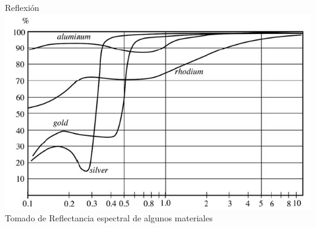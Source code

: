 \documentclass[aspectratio=169]{beamer}
\begin{document}
\begin{frame}{Reflexión}
            \centering
            \includegraphics[width = 0.7\linewidth]{fig/Optica/Reflectance_materials.PNG}\\
            \tiny{Tomado de \cite{Fraden_2016}}
            \tiny{Reflectancia espectral de algunos materiales}

\end{frame}
\end{document}
